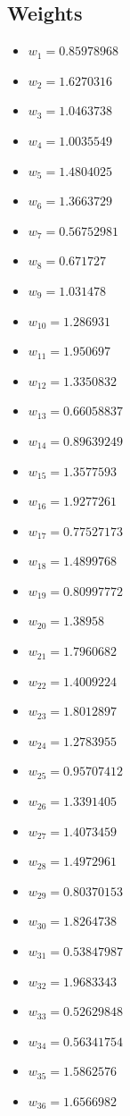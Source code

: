 \documentclass[11pt]{article}
\begin{document}
\subsection*{Weights}
\begin{itemize}
\item $w_{1} = 0.85978968$
\item $w_{2} = 1.6270316$
\item $w_{3} = 1.0463738$
\item $w_{4} = 1.0035549$
\item $w_{5} = 1.4804025$
\item $w_{6} = 1.3663729$
\item $w_{7} = 0.56752981$
\item $w_{8} = 0.671727$
\item $w_{9} = 1.031478$
\item $w_{10} = 1.286931$
\item $w_{11} = 1.950697$
\item $w_{12} = 1.3350832$
\item $w_{13} = 0.66058837$
\item $w_{14} = 0.89639249$
\item $w_{15} = 1.3577593$
\item $w_{16} = 1.9277261$
\item $w_{17} = 0.77527173$
\item $w_{18} = 1.4899768$
\item $w_{19} = 0.80997772$
\item $w_{20} = 1.38958$
\item $w_{21} = 1.7960682$
\item $w_{22} = 1.4009224$
\item $w_{23} = 1.8012897$
\item $w_{24} = 1.2783955$
\item $w_{25} = 0.95707412$
\item $w_{26} = 1.3391405$
\item $w_{27} = 1.4073459$
\item $w_{28} = 1.4972961$
\item $w_{29} = 0.80370153$
\item $w_{30} = 1.8264738$
\item $w_{31} = 0.53847987$
\item $w_{32} = 1.9683343$
\item $w_{33} = 0.52629848$
\item $w_{34} = 0.56341754$
\item $w_{35} = 1.5862576$
\item $w_{36} = 1.6566982$

\end{itemize}
\end{document}
